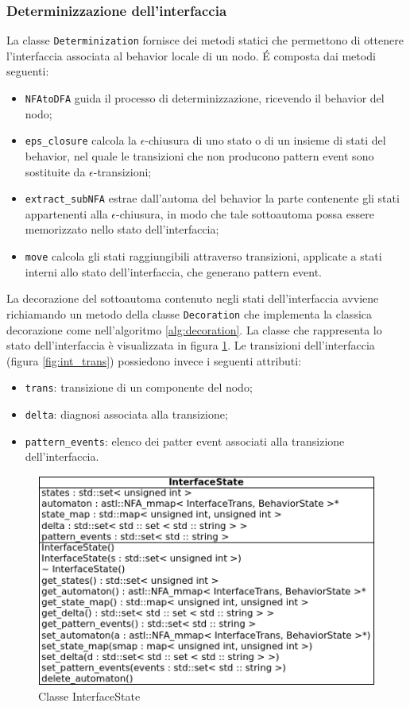 \subsubsection{Determinizzazione dell'interfaccia}
La classe \verb|Determinization| fornisce dei metodi statici che permettono di ottenere l'interfaccia associata al behavior locale di un nodo. 
\'E composta dai metodi seguenti:
\begin{itemize}
\item \verb|NFAtoDFA| guida il processo di determinizzazione, ricevendo il behavior del nodo;
\item \verb|eps_closure| calcola la $\epsilon$-chiusura di uno stato o di un insieme di stati del behavior, nel quale le transizioni che non producono pattern event sono sostituite da $\epsilon$-transizioni;
\item \verb|extract_subNFA| estrae dall'automa del behavior la parte contenente gli stati appartenenti alla $\epsilon$-chiusura, in modo che tale sottoautoma possa essere memorizzato nello stato dell'interfaccia;
\item \verb|move| calcola gli stati raggiungibili attraverso transizioni, applicate a stati interni allo stato dell'interfaccia, che generano pattern event.
\end{itemize}
La decorazione del sottoautoma contenuto negli stati dell'interfaccia avviene richiamando un metodo della classe \verb|Decoration| che implementa la classica decorazione come nell'algoritmo \ref{alg:decoration}.
La classe che rappresenta lo stato dell'interfaccia è visualizzata in figura \ref{fig:int_state}.
Le transizioni dell'interfaccia (figura \ref{fig:int_trans}) possiedono invece i seguenti attributi:
\begin{itemize}
\item \verb|trans|: transizione di un componente del nodo;
\item \verb|delta|: diagnosi associata alla transizione;
\item \verb|pattern_events|: elenco dei patter event associati alla transizione dell'interfaccia.
\end{itemize}

\begin{figure}[htbp]
\centering
\includegraphics[scale=0.7]{./Img/implementazione/int_state.png}
\caption{Classe InterfaceState}
\label{fig:int_state}
\end{figure}

